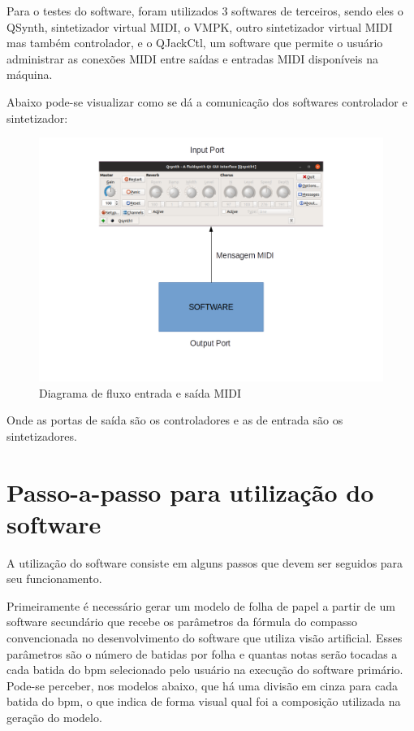 \documentclass[12pt]{report}
\begin{document}
Para o testes do software, foram utilizados 3 softwares de terceiros, sendo eles o QSynth, sintetizador virtual MIDI, o VMPK, outro sintetizador virtual MIDI mas também controlador, e o QJackCtl, um software que permite o usuário administrar as conexões MIDI entre saídas e entradas MIDI disponíveis na máquina.

Abaixo pode-se visualizar como se dá a comunicação dos softwares controlador e sintetizador:

\begin{figure}[H]
  \centering
  \includegraphics[width=1\textwidth]{imagens/Diagrama2.png}
  \caption{Diagrama de fluxo entrada e saída MIDI}
  \label{fig:diagrama}
\end{figure}

Onde as portas de saída são os controladores e as de entrada são os sintetizadores.



\chapter{Passo-a-passo para utilização do software}
A utilização do software consiste em alguns passos que devem ser seguidos para seu funcionamento.

Primeiramente é necessário gerar um modelo de folha de papel a partir de um software secundário que recebe os parâmetros da fórmula do compasso convencionada no desenvolvimento do software que utiliza visão artificial. Esses parâmetros são o número de batidas por folha e quantas notas serão tocadas a cada batida do bpm selecionado pelo usuário na execução do software primário. Pode-se perceber, nos modelos abaixo, que há uma divisão em cinza para cada batida do bpm, o que indica de forma visual qual foi a composição utilizada na geração do modelo.
\end{document}
